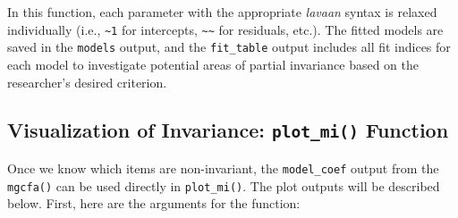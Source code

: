 \documentclass[
  man,floatsintext]{apa7}
\begin{document}
In this function, each parameter with the appropriate \emph{lavaan} syntax is relaxed individually (i.e., \texttt{\textasciitilde{}1} for intercepts, \texttt{\textasciitilde{}\textasciitilde{}} for residuals, etc.). The fitted models are saved in the \texttt{models} output, and the \texttt{fit\_table} output includes all fit indices for each model to investigate potential areas of partial invariance based on the researcher's desired criterion.

\subsection{\texorpdfstring{Visualization of Invariance: \texttt{plot\_mi()} Function}{Visualization of Invariance: plot\_mi() Function}}\label{visualization-of-invariance-plot_mi-function}

Once we know which items are non-invariant, the \texttt{model\_coef} output from the \texttt{mgcfa()} can be used directly in \texttt{plot\_mi()}. The plot outputs will be described below. First, here are the arguments for the function:
\end{document}
